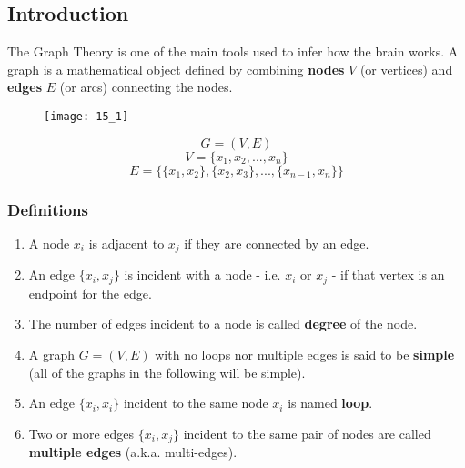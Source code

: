 \subsection{Introduction}
The Graph Theory is one of the main tools used to infer how the brain works. A graph is a mathematical object defined
by combining \textbf{nodes} \(V\) (or vertices) and \textbf{edges} \(E\) (or arcs) connecting the nodes.
\begin{figure}[H]
    \centering
    \texttt{[image: 15\_1]}
\end{figure}
\begin{equation*}
    G=(V,E)
\end{equation*}
\begin{equation*}
    V=\{x_1, x_2, ..., x_n\}
\end{equation*}
\begin{equation*}
    E=\{\{x_1, x_2\}, \{x_2,x_3\},..., \{x_{n-1},x_n\}\}
\end{equation*}
\subsubsection{Definitions}
\begin{enumerate}
    \item A node \(x_i\) is adjacent to \(x_j\) if they are connected by an edge.
    \item An edge \(\{x_i, x_j\}\) is incident with a node - i.e. \(x_i\) or \(x_j\) - if that vertex is an endpoint
          for the edge.
    \item The number of edges incident to a node is called \textbf{degree} of the node.
    \item A graph \(G=(V,E)\) with no loops nor multiple edges is said to be \textbf{simple} (all of the graphs in
          the following will be simple).
    \item An edge \(\{x_i,x_i\}\) incident to the same node \(x_i\) is named \textbf{loop}.
    \item Two or more edges \(\{x_i,x_j\}\) incident to the same pair of nodes are called \textbf{multiple edges}
          (a.k.a. multi-edges).
\end{enumerate}
